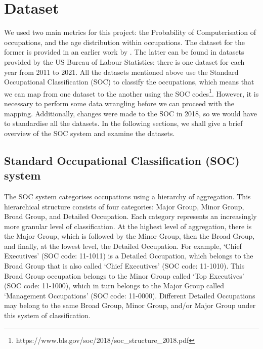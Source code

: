 \documentclass[11pt]{article}
\begin{document}
\newpage

\section{Dataset}
\label{sec:Dataset}
We used two main metrics for this project: the Probability of Computerisation of occupations, and the age distribution within occupations. The dataset for the former is provided in an earlier work by \cite{osborne2017future}. The latter can be found in datasets provided by the US Bureau of Labour Statistics; there is one dataset for each year from 2011 to 2021. All the datasets mentioned above use the Standard Occupational Classification (SOC) to classify the occupations, which means that we can map from one dataset to the another using the SOC codes\footnote{https://www.bls.gov/soc/2018/soc\_structure\_2018.pdf}. However, it is necessary to perform some data wrangling before we can proceed with the mapping. Additionally, changes were made to the SOC in 2018, so we would have to standardise all the datasets. In the following sections, we shall give a brief overview of the SOC system and examine the datasets.

\subsection*{Standard Occupational Classification (SOC) system}
The SOC system categorises occupations using a hierarchy of aggregation. This hierarchical structure consists of four categories: Major Group, Minor Group, Broad Group, and Detailed Occupation. Each category represents an increasingly more granular level of classification. At the highest level of aggregation, there is the Major Group, which is followed by the Minor Group, then the Broad Group, and finally, at the lowest level, the Detailed Occupation. For example, `Chief Executives' (SOC code: 11-1011) is a Detailed Occupation, which belongs to the Broad Group that is also called `Chief Executives' (SOC code: 11-1010). This Broad Group occupation belongs to the Minor Group called `Top Executives' (SOC code: 11-1000), which in turn belongs to the Major Group called `Management Occupations' (SOC code: 11-0000). Different Detailed Occupations may belong to the same Broad Group, Minor Group, and/or Major Group under this system of classification.
\end{document}
